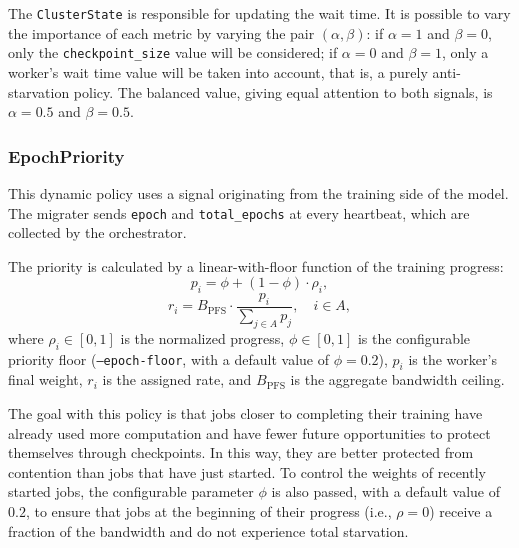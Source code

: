 \documentclass[sigplan,twocolumn,10pt,nonacm]{acmart}
\begin{document}
The \texttt{ClusterState} is responsible for updating the wait time. It is possible to vary the importance of each metric by varying the pair $(\alpha, \beta)$: if $\alpha = 1$ and $\beta = 0$, only the \texttt{checkpoint\_size} value will be considered; if $\alpha = 0$ and $\beta = 1$, only a worker's wait time value will be taken into account, that is, a purely anti-starvation policy. The balanced value, giving equal attention to both signals, is $\alpha = 0.5$ and $\beta = 0.5$.

\subsubsection{EpochPriority}
\label{sec:policy-epoch}

This dynamic policy uses a signal originating from the training side of the model. The migrater sends \texttt{epoch} and \texttt{total\_epochs} at every heartbeat, which are collected by the orchestrator.

The priority is calculated by a linear-with-floor function of the training progress:
\begin{equation}
    p_i = \phi + (1 - \phi) \cdot \rho_i,
    \label{eq:epoch-priority-weight}
\end{equation}
\begin{equation}
    r_i = B_{\text{PFS}} \cdot \frac{p_i}{\sum_{j \in A} p_j}, \quad i \in A,
    \label{eq:epoch-priority-rate}
\end{equation}
where
$\rho_i \in [0, 1]$ is the normalized progress, $\phi \in [0, 1]$ is the configurable priority floor (\texttt{--epoch-floor}, with a default value of $\phi = 0.2$), $p_i$ is the worker's final weight, $r_i$ is the assigned rate, and $B_{\text{PFS}}$ is the aggregate bandwidth ceiling.

The goal with this policy is that jobs closer to completing their training have already used more computation and have fewer future opportunities to protect themselves through checkpoints. In this way, they are better protected from contention than jobs that have just started. To control the weights of recently started jobs, the configurable parameter $\phi$ is also passed, with a default value of $0.2$, to ensure that jobs at the beginning of their progress (i.e., $\rho = 0$) receive a fraction of the bandwidth and do not experience total starvation.
\end{document}
